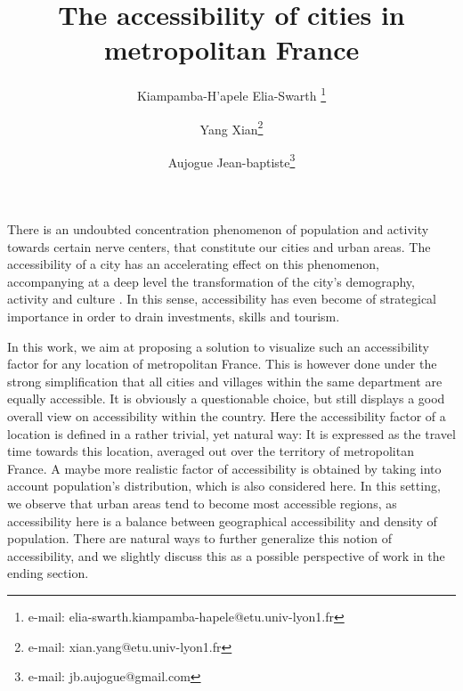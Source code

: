 \documentclass{vgtc}                          %
\title{The accessibility of cities in metropolitan France}
\author{ Kiampamba-H'apele Elia-Swarth \thanks{e-mail: elia-swarth.kiampamba-hapele@etu.univ-lyon1.fr}\\ %
\and Yang Xian\thanks{e-mail: xian.yang@etu.univ-lyon1.fr}\\ %
\and Aujogue Jean-baptiste\thanks{e-mail: jb.aujogue@gmail.com}} %
\begin{document}





\vspace{0.2cm}

\maketitle
There is an undoubted concentration phenomenon of population and activity towards certain nerve centers, that constitute our cities and urban areas. The accessibility of a city has an accelerating effect on this phenomenon, accompanying at a deep level the transformation of the city's demography, activity and culture \cite{RePEc:mtp:titles:0262561476}. In this sense, accessibility has even become of strategical importance in order to drain investments, skills and tourism. 


 In this work, we aim at proposing a solution to visualize such an accessibility factor for any location of metropolitan France. This is however done under the strong simplification that all cities and villages within the same department are equally accessible. It is obviously a questionable choice, but still displays a good overall view on accessibility within the country. Here the accessibility factor of a location is defined in a rather trivial, yet natural way: It is expressed as the travel time towards this location, averaged out over the territory of metropolitan France. A maybe more realistic factor of accessibility is obtained by taking into account population's distribution, which is also considered here. In this setting, we observe that urban areas tend to become most accessible regions, as accessibility here is a balance between geographical accessibility and density of population. There are natural ways to further generalize this notion of accessibility, and we slightly discuss this as a possible perspective of work in the ending section.
\end{document}
